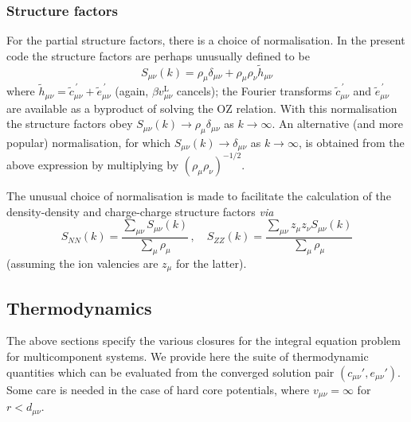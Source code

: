 \documentclass[12pt,a4paper]{article}
\newcommand{\latin}[1]{\emph{#1}}
\newcommand{\via}{\latin{via}}
\newcommand{\lr}{^{\mathrm{L}}}
\newcommand{\myprime}{^{{}\,\prime}}
\begin{document}
\subsubsection{Structure factors}
%
For the partial structure factors, there is a choice of normalisation.
In the present code the structure factors are perhaps unusually
defined to be
%
\begin{equation}
S_{\mu\nu}(k) = \rho_\mu\delta_{\mu\nu} + \rho_\mu\rho_\nu{\tilde
  h}_{\mu\nu}
\label{eq:skdef}
\end{equation}
%
where ${\tilde h}_{\mu\nu}={\tilde c}_{\mu\nu}\myprime + {\tilde
  e}_{\mu\nu}\myprime$ (again, $\beta v_{\mu\nu}\lr$ cancels); the
Fourier transforms ${\tilde c}_{\mu\nu}\myprime$ and ${\tilde
  e}_{\mu\nu}\myprime$ are available as a byproduct of solving the OZ
relation.  With this normalisation the structure factors obey
$S_{\mu\nu}(k)\to\rho_\mu\delta_{\mu\nu}$ as $k\to\infty$.  An
alternative (and more popular) normalisation, for which
$S_{\mu\nu}(k)\to\delta_{\mu\nu}$ as $k\to\infty$, is obtained from
the above expression by multiplying by $({\rho_\mu\rho_\nu})^{-1/2}$.

The unusual choice of normalisation is made to facilitate
the calculation of the density-density and charge-charge structure
factors \via\
%
\begin{equation}
  S_{NN}(k) = \frac{\sum_{\mu\nu}S_{\mu\nu}(k)}{\sum_\mu\rho_\mu}\,,\quad
  S_{ZZ}(k) = \frac{\sum_{\mu\nu}z_\mu z_\nu S_{\mu\nu}(k)}{\sum_\mu\rho_\mu}
  \label{eq:snnszz}
\end{equation}
%
(assuming the ion valencies are $z_\mu$ for the latter).

\subsection{Thermodynamics}
\label{sec:thermo}
%
The above sections specify the various closures for the
integral equation problem for multicomponent systems.  We provide here
the suite of thermodynamic quantities which can be evaluated from the
converged solution pair $(c_{\mu\nu}', e_{\mu\nu}')$.  Some care is
needed in the case of hard core potentials, where $v_{\mu\nu}=\infty$
for $r<d_{\mu\nu}$.
\end{document}
